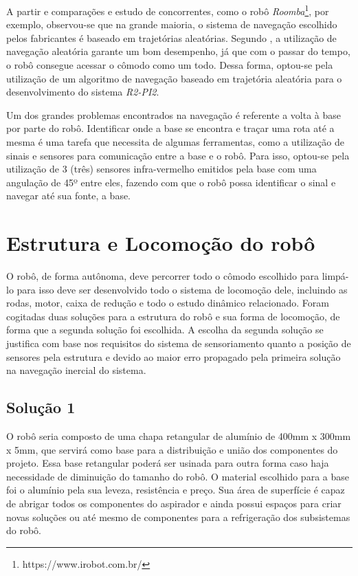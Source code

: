 	A partir e comparações e estudo de concorrentes, como o robô \textit{Roomba}\footnote{https://www.irobot.com.br/}, por exemplo, observou-se que na grande maioria, o sistema de navegação escolhido pelos fabricantes é baseado em trajetórias aleatórias. Segundo \cite{robo_limpeza_domesti}, a utilização de navegação aleatória garante um bom desempenho, já que com o passar do tempo, o robô consegue acessar o cômodo como um todo. Dessa forma, optou-se pela utilização de um algoritmo de navegação baseado em trajetória aleatória para o desenvolvimento do sistema \textit{R2-PI2}.

	Um dos grandes problemas encontrados na navegação é referente a volta à base por parte do robô. Identificar onde a base se encontra e traçar uma rota até a mesma é uma tarefa que necessita de algumas ferramentas, como a utilização de sinais e sensores para comunicação entre a base e o robô. Para isso, optou-se pela utilização de 3 (três) sensores infra-vermelho emitidos pela base com uma angulação de 45º entre eles, fazendo com que o robô possa identificar o sinal e navegar até sua fonte, a base.

\section{Estrutura e Locomoção do robô} %
\label{sub:alimentação}
	
	O robô, de forma autônoma, deve percorrer todo o cômodo escolhido para limpá-lo para isso deve ser desenvolvido todo o sistema de locomoção dele, incluindo as rodas, motor, caixa de redução e todo o estudo dinâmico relacionado. Foram cogitadas duas soluções para a estrutura do robô e sua forma de locomoção, de forma que a segunda solução foi escolhida. A escolha da segunda solução se justifica com base nos requisitos do sistema de sensoriamento quanto a posição de sensores pela estrutura e devido ao maior erro propagado pela primeira solução na navegação inercial do sistema. 

	\subsection{Solução 1} %
	\label{sub:solução_1}

		O robô seria composto de uma chapa retangular de alumínio de 400mm x 300mm x 5mm, que servirá como base para a distribuição e união dos componentes do projeto. Essa base retangular poderá ser usinada para outra forma caso haja necessidade de diminuição do tamanho do robô. O material escolhido para a base foi o alumínio pela sua leveza, resistência e preço. Sua área  de superfície é capaz de abrigar todos os componentes do aspirador e ainda possui espaços para criar novas soluções ou até mesmo de componentes para a refrigeração dos subsistemas do robô.

